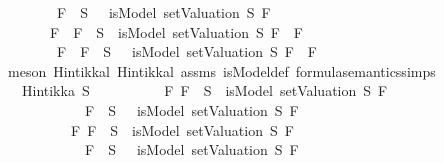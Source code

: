 \begin{isabellebody}
\ \ \ \ \ \ \ {\isacharparenleft}\isactrlbold {\isasymnot}\ F{}\ {\isasymin}\ S\ {\isasymlongrightarrow}\ {\isasymnot}\ isModel\ {\isacharparenleft}setValuation\ S{\isacharparenright}\ F{}{\isacharparenright}\ {\isasymLongrightarrow}\isanewline
\ \ \ \ \ \ \ {\isacharparenleft}F{}\ \isactrlbold {\isasymand}\ F{}\ {\isasymin}\ S\ {\isasymlongrightarrow}\ isModel\ {\isacharparenleft}setValuation\ S{\isacharparenright}\ {\isacharparenleft}F{}\ \isactrlbold {\isasymand}\ F{}{\isacharparenright}{\isacharparenright}\ {\isasymand}\isanewline
\ \ \ \ \ \ \ {\isacharparenleft}\isactrlbold {\isasymnot}\ {\isacharparenleft}F{}\ \isactrlbold {\isasymand}\ F{}{\isacharparenright}\ {\isasymin}\ S\ {\isasymlongrightarrow}\ {\isasymnot}\ isModel\ {\isacharparenleft}setValuation\ S{\isacharparenright}\ {\isacharparenleft}F{}\ \isactrlbold {\isasymand}\ F{}{\isacharparenright}{\isacharparenright}{\isachardoublequoteclose}\isanewline
%
\isadelimproof
\ \ %
\endisadelimproof
%
\isatagproof
{}\isamarkupfalse%
\ {\isacharparenleft}meson\ Hintikka{\isacharunderscore}l{}\ Hintikka{\isacharunderscore}l{}\ assms\ isModel{\isacharunderscore}def\ formula{\isacharunderscore}semantics{\isachardot}simps{\isacharparenleft}{}{\isacharparenright}{\isacharparenright}%
\endisatagproof
{\isafoldproof}%
%
\isadelimproof
\isanewline
%
\endisadelimproof
\isanewline
{}\isamarkupfalse%
\isanewline
\ \ \ {\isachardoublequoteopen}Hintikka\ S{\isachardoublequoteclose}\isanewline
\ \ \ \ \ \ \ \ \ \ {\isachardoublequoteopen}{\isasymAnd}F{}{\isachardot}\ {\isacharparenleft}F{}\ {\isasymin}\ S\ {\isasymlongrightarrow}\ isModel\ {\isacharparenleft}setValuation\ S{\isacharparenright}\ F{}{\isacharparenright}\ {\isasymand}\isanewline
\ \ \ \ \ \ \ \ \ \ \ {\isacharparenleft}\isactrlbold {\isasymnot}\ F{}\ {\isasymin}\ S\ {\isasymlongrightarrow}\ {\isasymnot}\ isModel\ {\isacharparenleft}setValuation\ S{\isacharparenright}\ F{}{\isacharparenright}{\isachardoublequoteclose}\ \isanewline
\ \ \ \ \ \ \ \ \ \ {\isachardoublequoteopen}{\isasymAnd}F{}{\isachardot}\ {\isacharparenleft}F{}\ {\isasymin}\ S\ {\isasymlongrightarrow}\ isModel\ {\isacharparenleft}setValuation\ S{\isacharparenright}\ F{}{\isacharparenright}\ {\isasymand}\isanewline
\ \ \ \ \ \ \ \ \ \ \ {\isacharparenleft}\isactrlbold {\isasymnot}\ F{}\ {\isasymin}\ S\ {\isasymlongrightarrow}\ {\isasymnot}\ isModel\ {\isacharparenleft}setValuation\ S{\isacharparenright}\ F{}{\isacharparenright}{\isachardoublequoteclose}\isanewline

\end{isabellebody}
